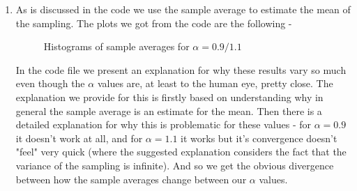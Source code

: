 \documentclass[../main.tex]{subfiles}
\begin{document}
\begin{enumerate}
\item As is discussed in the code we use the sample average to estimate the mean of the sampling. The plots we got from the code are the following -

\begin{figure}[H]
\centering
{}%
\hfill %
%
\caption{Histograms of sample averages for $\alpha=0.9/1.1$}
\end{figure}

In the code file we present an explanation for why these results vary so much even though the $\alpha$ values are, at least to the human eye, pretty close. The explanation we provide for this is firstly based on understanding why in general the sample average is an estimate for the mean. Then there is a detailed explanation for why this is problematic for these values - for $\alpha=0.9$ it doesn't work at all, and for $\alpha=1.1$ it works but it's convergence doesn't "feel" very quick (where the suggested explanation considers the fact that the variance of the sampling is infinite). And so we get the obvious divergence between how the sample averages change between our $\alpha$ values. \qedsymbol

\end{enumerate}
\end{document}
